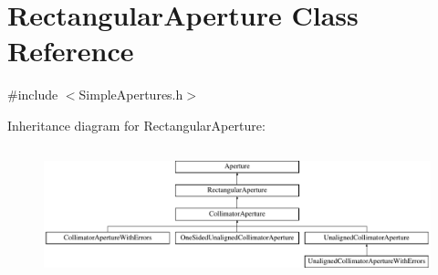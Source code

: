 \hypertarget{classRectangularAperture}{}\section{Rectangular\+Aperture Class Reference}
\label{classRectangularAperture}


{\ttfamily \#include $<$Simple\+Apertures.\+h$>$}

Inheritance diagram for Rectangular\+Aperture\+:\begin{figure}[H]
\begin{center}
\leavevmode
\includegraphics[height=3.856750cm]{classRectangularAperture}
\end{center}
\end{figure}
